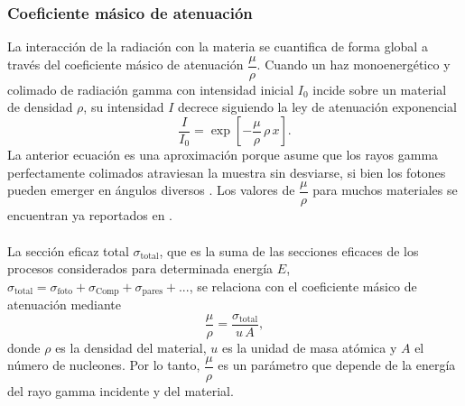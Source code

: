 		\subsubsection{Coeficiente másico de atenuación}
La interacción de la radiación con la materia se cuantifica de forma global a través del coeficiente másico de atenuación  $\dfrac{\mu}{\rho}$. Cuando un haz monoenergético y colimado de radiación gamma con intensidad inicial $I_0$ incide sobre un material de densidad $\rho$, su intensidad $I$ decrece siguiendo la ley de atenuación exponencial \cite{CUTSHALL1983309, NIST}
\begin{equation}\label{Eq-Atenuacion}
\dfrac{I}{I_0} = \exp\left[-\dfrac{\mu}{\rho}\,\rho\,x\right].
\end{equation}
La anterior ecuación es una aproximación porque asume que los rayos gamma perfectamente colimados atraviesan la muestra sin desviarse, si bien los fotones pueden emerger en ángulos diversos \cite{IURIAN2018151}. Los valores de $\dfrac{\mu}{\rho}$ para muchos materiales se encuentran ya reportados en \cite{NIST}.
\\
\\
La sección eficaz total $\sigma_\text{total}$, que es la suma de las secciones eficaces de los procesos considerados para determinada energía $E$, $\sigma_\text{total} = \sigma_\text{foto} + \sigma_\text{Comp} + \sigma_\text{pares} + ...$, se relaciona con el coeficiente másico de atenuación mediante \cite{NIST}
\begin{equation}\label{Eq-Mu}
\dfrac{\mu}{\rho} = \dfrac{\sigma_\text{total}}{u\,A},
\end{equation}
donde $\rho$ es la densidad del material, $u$ es la unidad de masa atómica y $A$ el número de nucleones. Por lo tanto, $\dfrac{\mu}{\rho}$ es un parámetro que depende de la energía del rayo gamma incidente y del material.
